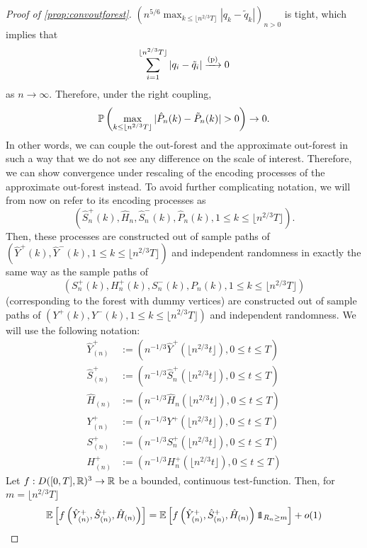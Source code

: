 \begin{proof}[Proof of \cref{prop:convoutforest}]
$\left(n^{5/6}\max_{k\leq \lfloor n^{2/3}T\rfloor }|q_k-\tilde{q}_k|\right)_{n>0}$ is tight, which implies that 
$$\sum_{i=1}^{\lfloor n^{2/3}T\rfloor }|q_i-\tilde{q}_i|\xrightarrow[]{\mathrm{(p)}}0$$
as $n\to \infty$. 
Therefore, under the right coupling, 
$$\P\left(\max_{k\leq \lfloor n^{2/3} T \rfloor}|\hat{P}_n(k)-\tilde{P}_n(k)|>0\right)\to 0.$$
In other words, we can couple the out-forest and the approximate out-forest in such a way that we do not see any difference on the scale of interest. Therefore, we can show convergence under rescaling of the encoding processes of the approximate out-forest instead. To avoid further complicating notation, we will from now on refer to its encoding processes as $$(\hat{S}^{+}_n(k),\hat{H}_n, \hat{S}^-_n(k), \hat{P}_n(k),1\leq k\leq \lfloor n^{2/3}T\rfloor).$$ Then, these processes are constructed out of sample paths of $(\hat{Y}^+(k),\hat{Y}^-(k), 1\leq k\leq \lfloor n^{2/3}T\rfloor )$ and independent randomness in exactly the same way as the sample paths of $$({S}_n^{+}(k),{H}_n^+(k),{S}_n^-(k),P_n(k),1\leq  k \leq \lfloor n^{2/3}T\rfloor )$$  (corresponding to the forest with dummy vertices) are constructed out of sample paths of $(Y^+(k),Y^-(k),1\leq  k\leq \lfloor n^{2/3}T\rfloor )$ and independent randomness. 
We will use the following notation:\begin{align*}
    \hat{Y}^+_{(n)}&:=\left(n^{-1/3}\hat{Y}^+\left(\lfloor n^{2/3} t \rfloor\right),0\leq t \leq T\right)\\
    \hat{S}^{+}_{(n)}&:=\left(n^{-1/3}\hat{S}^{+}_n\left(\lfloor n^{2/3} t \rfloor\right),0\leq t \leq T\right)\\
    \hat{H}_{(n)}&:=\left(n^{-1/3}\hat{H}_n\left(\lfloor n^{2/3} t \rfloor\right),0\leq t \leq T\right)\\
    {Y}^+_{(n)}&:=\left(n^{-1/3}{Y}^+\left(\lfloor n^{2/3} t \rfloor\right),0\leq t \leq T\right)\\
     {S}^{+}_{(n)}&:=\left(n^{-1/3}{S}^{+}_n\left(\lfloor n^{2/3} t \rfloor\right),0\leq t \leq T\right)\\
    {H}^+_{(n)}&:=\left(n^{-1/3}{H}^+_n\left(\lfloor n^{2/3} t \rfloor\right),0\leq t \leq T\right)
\end{align*}
Let $f:D([0,T],{\mathbb R})^3\to {\mathbb R}$ be a bounded, continuous test-function. Then, for $m=\lfloor n^{2/3}T\rfloor$
\begin{align*}\E\left[f\left(\hat{Y}^+_{(n)}, \hat{S}^+_{(n)},  \hat{H}_{(n)}\right) \right]&= \E\left[f\left(\hat{Y}^+_{(n)}, \hat{S}^+_{(n)},  \hat{H}_{(n)}\right) \one_{R_n\geq m} \right]+o(1)\\

\end{align*}
\end{proof}
